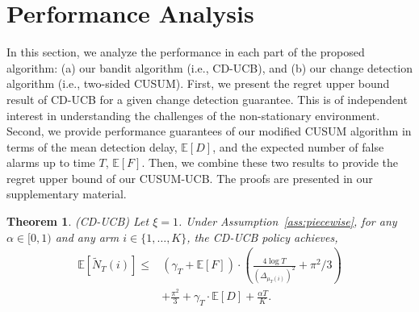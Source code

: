 \documentclass[letterpaper]{article} %
\newtheorem{theorem}{Theorem}
\newcommand{\blue}{}
\begin{document}
\section{Performance Analysis}\label{sec:analysis}

{In this section, we analyze the performance in each part of the proposed
algorithm: (a) our bandit algorithm (i.e., CD-UCB), and (b) our change
detection algorithm (i.e., two-sided CUSUM).  First, we present the
regret upper bound result of CD-UCB for a given change detection
guarantee.
This is of independent interest in understanding the
challenges of the non-stationary environment.  Second, we provide 
performance guarantees of our modified CUSUM algorithm in terms of the
mean detection delay, $\mathbb{E}[D]$, and the expected number of false alarms up to time $T$, $\mathbb{E}[F]$. Then, we combine
these two results to provide the regret upper bound of our CUSUM-UCB.}
{\blue The proofs are presented in our supplementary material.}


\begin{theorem}\label{thm:CD-UCB}
\emph{(CD-UCB)} Let $\xi=1$. Under Assumption~\ref{ass:piecewise}, for any $\alpha\in[0,1)$ and any arm $i\in\{1,\ldots,K\}$, the CD-UCB policy achieves,
\begin{eqnarray}\label{thm1}
\mathbb{E}[\tilde{N}_T(i)]\leq  
&\left(\gamma_T+\mathbb{E}[F]\right)\cdot\left(\frac{4\log T}{(\Delta_{\mu_T(i)})^2}+\pi^2/3\right) \\\nonumber
&+\frac{\pi^2}{3}
+\gamma_T\cdot \mathbb{E}[D]+\frac{\alpha T}{K}.
\end{eqnarray}
\end{theorem}
\end{document}
